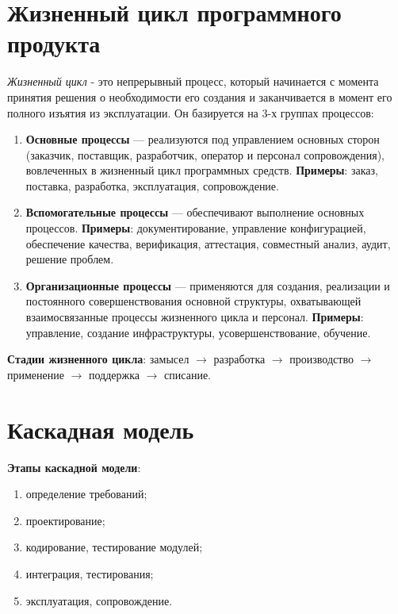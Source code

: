 \documentclass[a4paper,12pt,oneside]{extbook}
\begin{document}
\section{Жизненный цикл программного продукта}%
\label{sec:Жизненный цикл программного продукта}

\textit{Жизненный цикл} - это непрерывный процесс, который начинается с момента
принятия решения о необходимости его создания и заканчивается в момент его
полного изъятия из эксплуатации. Он базируется на 3-х группах процессов:
\begin{enumerate}
    \item \textbf{Основные процессы} — реализуются под управлением основных сторон
          (заказчик, поставщик, разработчик, оператор и персонал сопровождения),
          вовлеченных в жизненный цикл программных средств. \newline
          \textbf{Примеры}: заказ, поставка, разработка, эксплуатация,
          сопровождение.
    \item \textbf{Вспомогательные процессы} — обеспечивают выполнение основных
          процессов. \newline \textbf{Примеры}: документирование, управление
          конфигурацией, обеспечение качества, верификация, аттестация, совместный
          анализ, аудит, решение проблем.
    \item \textbf{Организационные процессы} — применяются для создания, реализации
          и постоянного совершенствования основной структуры, охватывающей
          взаимосвязанные процессы жизненного цикла и персонал. \newline
          \textbf{Примеры}: управление, создание инфраструктуры,
          усовершенствование, обучение.
\end{enumerate}

\textbf{Стадии жизненного цикла}: замысел \(\longrightarrow\) разработка
\(\longrightarrow\) производство \(\longrightarrow\) применение
\(\longrightarrow\) поддержка \(\longrightarrow\) списание.

\section{Каскадная модель}%
\label{sec:Каскадная модель}

\textbf{Этапы каскадной модели}:
\begin{enumerate}
    \item определение требований;
    \item проектирование;
    \item кодирование, тестирование модулей;
    \item интеграция, тестирования;
    \item эксплуатация, сопровождение.
\end{enumerate}
\end{document}
